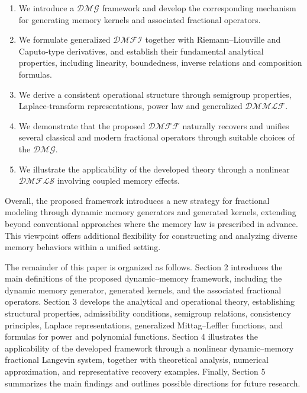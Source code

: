 \documentclass[11pt]{article}
\numberwithin{equation}{section}
\begin{document}
\begin{enumerate}[label=(\roman*),itemsep=1pt,topsep=1pt,parsep=0pt,partopsep=0pt]

\item
We introduce a $\mathcal{DMG}$ framework and develop the corresponding mechanism for generating memory kernels and associated fractional operators.

\item
We formulate generalized $\mathcal{DMFI}$ together with Riemann--Liouville and Caputo-type derivatives, and establish their fundamental analytical properties, including linearity, boundedness, inverse relations and composition formulas.

\item
We derive a consistent operational structure through semigroup properties, Laplace-transform representations, power law and generalized $\mathcal{DMMLF}$.

\item
We demonstrate that the proposed $\mathcal{DMFF}$ naturally recovers and unifies several classical and modern fractional operators through suitable choices of the $\mathcal{DMG}$.

\item
We illustrate the applicability of the developed theory through a nonlinear $\mathcal{DMFLS}$ involving coupled memory effects.

\end{enumerate}
Overall, the proposed framework introduces a new strategy for fractional modeling through dynamic memory generators and generated kernels, extending beyond conventional approaches where the memory law is prescribed in advance. This viewpoint offers additional flexibility for constructing and analyzing diverse memory behaviors within a unified setting.

The remainder of this paper is organized as follows. Section 2 introduces the main definitions of the proposed dynamic--memory framework, including the dynamic memory generator, generated kernels, and the associated fractional operators. Section 3 develops the analytical and operational theory, establishing structural properties, admissibility conditions, semigroup relations, consistency principles, Laplace representations, generalized Mittag--Leffler functions, and formulas for power and polynomial functions. Section 4 illustrates the applicability of the developed framework through a nonlinear dynamic--memory fractional Langevin system, together with theoretical analysis, numerical approximation, and representative recovery examples. Finally, Section 5 summarizes the main findings and outlines possible directions for future research.%
\end{document}
